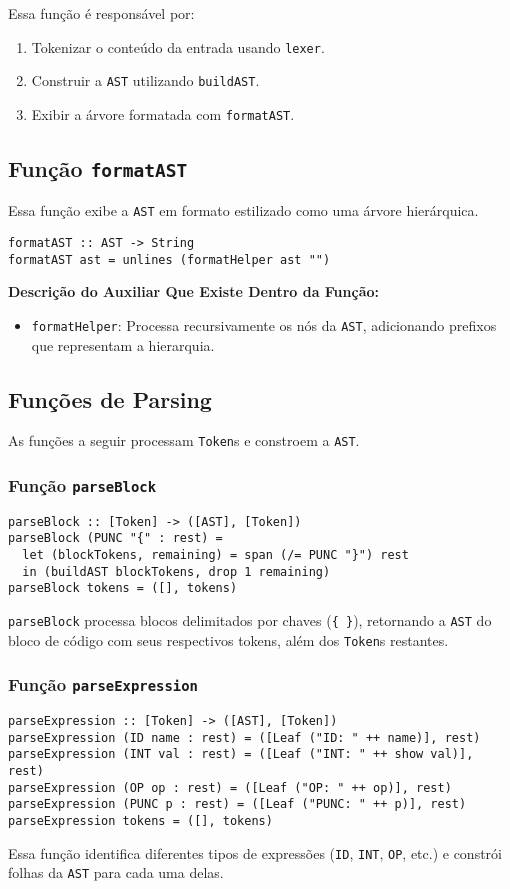 \documentclass{article}
\begin{document}
Essa função é responsável por:
\begin{enumerate}
    \item Tokenizar o conteúdo da entrada usando \texttt{lexer}.
    \item Construir a \texttt{AST} utilizando \texttt{buildAST}.
    \item Exibir a árvore formatada com \texttt{formatAST}.
\end{enumerate}

\newpage
\subsection{Função \texttt{formatAST}}
Essa função exibe a \texttt{AST} em formato estilizado como uma árvore hierárquica. 
\begin{verbatim}
formatAST :: AST -> String
formatAST ast = unlines (formatHelper ast "")
\end{verbatim}

\textbf{Descrição do Auxiliar Que Existe Dentro da Função:}
\begin{itemize}
    \item \texttt{formatHelper}: Processa recursivamente os nós da \texttt{AST}, adicionando prefixos que representam a hierarquia.
\end{itemize}

\subsection{Funções de Parsing}
As funções a seguir processam \texttt{Token}s e constroem a \texttt{AST}.

\subsubsection{Função \texttt{parseBlock}}
\begin{verbatim}
parseBlock :: [Token] -> ([AST], [Token])
parseBlock (PUNC "{" : rest) =
  let (blockTokens, remaining) = span (/= PUNC "}") rest
  in (buildAST blockTokens, drop 1 remaining)
parseBlock tokens = ([], tokens)
\end{verbatim}
\texttt{parseBlock} processa blocos delimitados por chaves (\texttt{\{ \}}), retornando a \texttt{AST} do bloco de código com seus respectivos tokens, além dos \texttt{Token}s restantes.

\subsubsection{Função \texttt{parseExpression}}
\begin{verbatim}
parseExpression :: [Token] -> ([AST], [Token])
parseExpression (ID name : rest) = ([Leaf ("ID: " ++ name)], rest)
parseExpression (INT val : rest) = ([Leaf ("INT: " ++ show val)], rest)
parseExpression (OP op : rest) = ([Leaf ("OP: " ++ op)], rest)
parseExpression (PUNC p : rest) = ([Leaf ("PUNC: " ++ p)], rest)
parseExpression tokens = ([], tokens)
\end{verbatim}
Essa função identifica diferentes tipos de expressões (\texttt{ID}, \texttt{INT}, \texttt{OP}, etc.) e constrói folhas da \texttt{AST} para cada uma delas.
\end{document}

